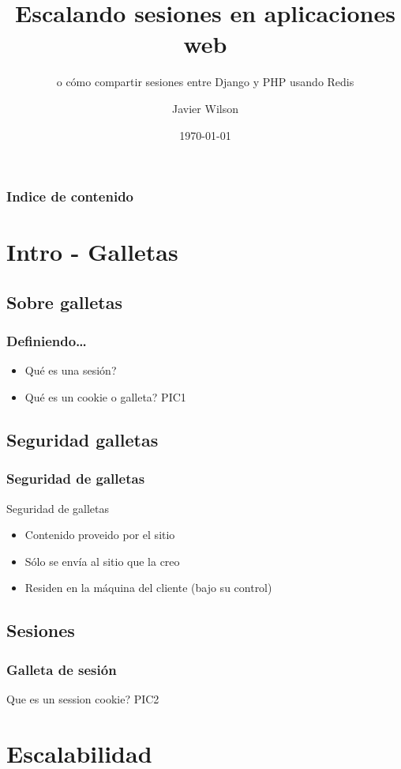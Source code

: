 \documentclass{beamer}
\begin{document}
\title{Escalando sesiones en aplicaciones web}
\subtitle{o cómo compartir sesiones entre Django y PHP usando Redis}
\author{Javier Wilson}
\date{\today} 

\begin{frame}
\titlepage
\end{frame}

\begin{frame}\frametitle{Indice de contenido}\tableofcontents
\end{frame} 


\section{Intro - Galletas} 
\subsection{Sobre galletas} 
\begin{frame}\frametitle{Definiendo\ldots}
\begin{itemize}
\item Qué es una sesión? \pause
\item Qué es un cookie o galleta? PIC1
\end{itemize} 
\end{frame}

\subsection{Seguridad galletas} 
\begin{frame}\frametitle{Seguridad de galletas}
Seguridad de galletas
\begin{itemize}
\item Contenido proveido por el sitio \pause
\item Sólo se envía al sitio que la creo \pause
\item Residen en la máquina del cliente (bajo su control)
\end{itemize} 
\end{frame}

\subsection{Sesiones}
\begin{frame}\frametitle{Galleta de sesión}
Que es un session cookie?
PIC2
\end{frame}

\section{Escalabilidad} 
\end{document}
